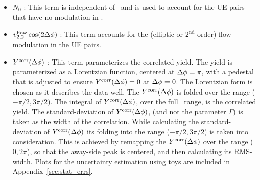 \begin{itemize}
  \item $N_0$ : 
    This term is independent of \Dphi\ and is used to account for
      the UE pairs that have no modulation in \Dphi.

  \item $v^{\mathrm{flow}}_{2,2}\cos(2\mbox{$\Delta\phi$})$ : 
    This term accounts for the (elliptic or $2^{\mathrm{nd}}$-order) flow modulation in the UE pairs.

  \item $Y^{\mathrm{corr}}(\mbox{$\Delta\phi$})$ : 
    This term parameterizes the correlated yield.
    The yield is parameterized as a Lorentzian function, 
      centered at $\mbox{$\Delta\phi$}=\pi$, with a pedestal that is adjusted
      to ensure $Y^{\mathrm{corr}} (\mbox{$\Delta\phi$})=0$ at $\mbox{$\Delta\phi$}=0$.
    The Lorentzian form is chosen as it describes the data well.
    The $Y^{\mathrm{corr}}(\mbox{$\Delta\phi$})$ is folded over the range 
      ($-\pi/2,3\pi/2$).
    The integral of $Y^{\mathrm{corr}}(\mbox{$\Delta\phi$})$, over the full \Dphi\ range,
      is the correlated yield.
    The standard-deviation of $Y^{\mathrm{corr}}(\mbox{$\Delta\phi$})$, 
      (and not the parameter $\Gamma$) is taken as
      the width of the correlation.
    While calculating the standard-deviation of $Y^{\mathrm{corr}}(\mbox{$\Delta\phi$})$
      its folding into the range ($-\pi/2,3\pi/2$) is taken into consideration.
    This is achieved by remapping the $Y^{\mathrm{corr}}(\mbox{$\Delta\phi$})$
      over the range ($0,2\pi$), so that the away-side peak is centered, 
      and then calculating its RMS-width.
    \iftoggle{IncludeYields}
    {
      The correlated yields and the RMS-widths are calculated directly 
        using the fit function Eq.~\ref{eq:signal_func}.
      Statistical uncertainties in the yields and RMS-widths are
        obtained using toys, where $dN/d\Dphi$ distribution
        are resampled and refitted using Eq.\eqref{eq:fit_func},
        and the standard deviations in the yields and RMS-widths
        in the resamplings are taken as the corresponding uncertainties.
    }
    {
      The RMS-widths of the correlated pair-distribution are calculated directly 
        using the fit function Eq.~\ref{eq:signal_func}.
      Statistical uncertainties of the RMS-widths are
        obtained using toys, where $dN/d\Dphi$ distribution
        are resampled and refitted using Eq.\eqref{eq:fit_func},
        and the standard deviations of the RMS-widths
        in the resamplings are taken as the corresponding uncertainty.
    }
    Plots for the uncertainty estimation using toys are included in Appendix~\ref{sec:stat_errs}.
\end{itemize}


